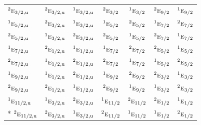 \documentclass[10pt,a4paper]{article}
\numberwithin{equation}{section}
\newcommand{\irr}[1]{\text{\normalfont\scshape #1}}
\newcommand{\conjpair}[1]{{}^{#1}}
\newcommand{\ptag}[1]{\mathrm{#1}}
\begin{document}
{\begin{longtable}{@{}lcccccc@{}}
$\conjpair{2}\irr{e}_{3/2,\ptag{u}}$ & $\conjpair{2}\irr{e}_{3/2,\ptag{u}}$ & $\conjpair{1}\irr{e}_{3/2,\ptag{u}}$ & $\conjpair{2}\irr{e}_{3/2}$ & $\conjpair{1}\irr{e}_{3/2}$ & $\conjpair{2}\irr{e}_{9/2}$ & $\conjpair{1}\irr{e}_{9/2}$\\
$\conjpair{1}\irr{e}_{5/2,\ptag{u}}$ & $\conjpair{2}\irr{e}_{3/2,\ptag{u}}$ & $\conjpair{1}\irr{e}_{3/2,\ptag{u}}$ & $\conjpair{1}\irr{e}_{5/2}$ & $\conjpair{2}\irr{e}_{5/2}$ & $\conjpair{1}\irr{e}_{7/2}$ & $\conjpair{2}\irr{e}_{7/2}$\\
$\conjpair{2}\irr{e}_{5/2,\ptag{u}}$ & $\conjpair{1}\irr{e}_{3/2,\ptag{u}}$ & $\conjpair{2}\irr{e}_{3/2,\ptag{u}}$ & $\conjpair{2}\irr{e}_{5/2}$ & $\conjpair{1}\irr{e}_{5/2}$ & $\conjpair{2}\irr{e}_{7/2}$ & $\conjpair{1}\irr{e}_{7/2}$\\
$\conjpair{1}\irr{e}_{7/2,\ptag{u}}$ & $\conjpair{2}\irr{e}_{1/2,\ptag{u}}$ & $\conjpair{1}\irr{e}_{1/2,\ptag{u}}$ & $\conjpair{1}\irr{e}_{7/2}$ & $\conjpair{2}\irr{e}_{7/2}$ & $\conjpair{2}\irr{e}_{5/2}$ & $\conjpair{1}\irr{e}_{5/2}$\\
$\conjpair{2}\irr{e}_{7/2,\ptag{u}}$ & $\conjpair{1}\irr{e}_{1/2,\ptag{u}}$ & $\conjpair{2}\irr{e}_{1/2,\ptag{u}}$ & $\conjpair{2}\irr{e}_{7/2}$ & $\conjpair{1}\irr{e}_{7/2}$ & $\conjpair{1}\irr{e}_{5/2}$ & $\conjpair{2}\irr{e}_{5/2}$\\
$\conjpair{1}\irr{e}_{9/2,\ptag{u}}$ & $\conjpair{1}\irr{e}_{1/2,\ptag{u}}$ & $\conjpair{2}\irr{e}_{1/2,\ptag{u}}$ & $\conjpair{1}\irr{e}_{9/2}$ & $\conjpair{2}\irr{e}_{9/2}$ & $\conjpair{2}\irr{e}_{3/2}$ & $\conjpair{1}\irr{e}_{3/2}$\\
$\conjpair{2}\irr{e}_{9/2,\ptag{u}}$ & $\conjpair{2}\irr{e}_{1/2,\ptag{u}}$ & $\conjpair{1}\irr{e}_{1/2,\ptag{u}}$ & $\conjpair{2}\irr{e}_{9/2}$ & $\conjpair{1}\irr{e}_{9/2}$ & $\conjpair{1}\irr{e}_{3/2}$ & $\conjpair{2}\irr{e}_{3/2}$\\
$\conjpair{1}\irr{e}_{11/2,\ptag{u}}$ & $\conjpair{1}\irr{e}_{3/2,\ptag{u}}$ & $\conjpair{2}\irr{e}_{3/2,\ptag{u}}$ & $\conjpair{1}\irr{e}_{11/2}$ & $\conjpair{2}\irr{e}_{11/2}$ & $\conjpair{2}\irr{e}_{1/2}$ & $\conjpair{1}\irr{e}_{1/2}$\\*
$\conjpair{2}\irr{e}_{11/2,\ptag{u}}$ & $\conjpair{2}\irr{e}_{3/2,\ptag{u}}$ & $\conjpair{1}\irr{e}_{3/2,\ptag{u}}$ & $\conjpair{2}\irr{e}_{11/2}$ & $\conjpair{1}\irr{e}_{11/2}$ & $\conjpair{1}\irr{e}_{1/2}$ & $\conjpair{2}\irr{e}_{1/2}$\\
\bottomrule\end{longtable}}
\end{document}
